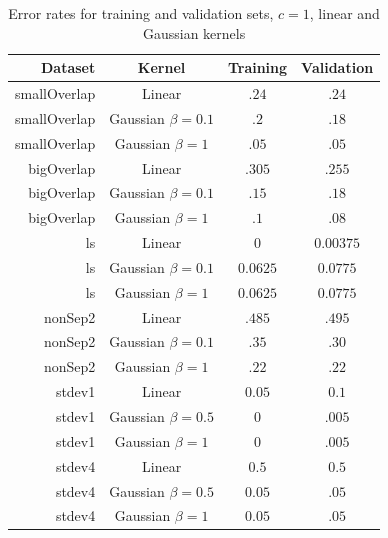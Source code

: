 \documentclass[10pt]{article}
\begin{document}
\begin{table}[!ht]
\centering
\begin{tabular}{r|c|c|c}
	Dataset & Kernel & Training & Validation \\ \hline
	smallOverlap & Linear & $.24$ & $.24$ \\
	smallOverlap & Gaussian $\beta = 0.1$ & $.2$ & $.18$ \\
	smallOverlap & Gaussian $\beta = 1$ & $.05$ & $.05$ \\
	bigOverlap & Linear & $.305$ & $.255$ \\
	bigOverlap & Gaussian $\beta = 0.1$ & $.15$ & $.18$ \\
	bigOverlap & Gaussian $\beta = 1$ & $.1$ & $.08$ \\
	ls & Linear & $0$ & $0.00375$ \\
	ls & Gaussian $\beta = 0.1$ & $0.0625$ & $0.0775$ \\
	ls & Gaussian $\beta = 1$ & $0.0625$ & $0.0775$ \\
	nonSep2 & Linear & $.485$ & $.495$ \\
	nonSep2 & Gaussian $\beta = 0.1$ & $.35$ & $.30$ \\
	nonSep2 & Gaussian $\beta = 1$ & $.22$ & $.22$ \\
	stdev1 & Linear & $0.05$ & $0.1$ \\
	stdev1 & Gaussian $\beta = 0.5$ & $0$ & $.005$ \\
	stdev1 & Gaussian $\beta = 1$ & $0$ & $.005$ \\
	stdev4 & Linear & $0.5$ & $0.5$ \\
	stdev4 & Gaussian $\beta = 0.5$ & $0.05$ & $.05$ \\
	stdev4 & Gaussian $\beta = 1$ & $0.05$ & $.05$ \\
\end{tabular}
\caption{Error rates for training and validation sets, $c = 1$, linear and Gaussian kernels}
\label{tbl:1-2-error}
\end{table}

\end{document}
